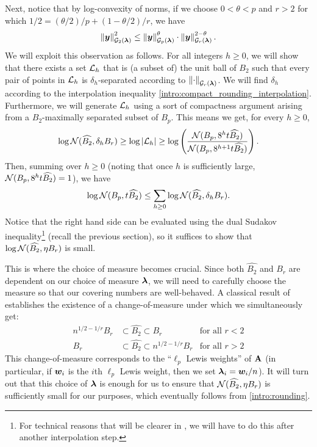 \documentclass[11pt]{article}
\numberwithin{equation}{section}
\begin{document}
Next, notice that by log-convexity of norms, if we choose $0 < \theta < p$ and $r > 2$ for which $1/2 = (\theta/2)/p + (1-\theta/2)/r$, we have
\begin{align}
    \left\lVert \bm{y} \right\rVert_{\mathcal{G}_{2}(\bm{\lambda})}^2 \le \left\lVert \bm{y} \right\rVert_{\mathcal{G}_{p}(\bm{\lambda})}^{\theta} \cdot \left\lVert \bm{y} \right\rVert_{\mathcal{G}_{r}(\bm{\lambda})}^{2-\theta}.\label{intro:compact_rounding_interpolation}
\end{align}
We will exploit this observation as follows. For all integers $h \ge 0$, we will show that there exists a set $\mathcal{L}_h$ that is (a subset of) the unit ball of $B_2$ such that every pair of points in $\mathcal{L}_h$ is $\delta_h$-separated according to $\left\lVert \cdot \right\rVert_{\mathcal{G}_{r}(\bm{\lambda})}$. We will find $\delta_h$ according to the interpolation inequality \eqref{intro:compact_rounding_interpolation}. Furthermore, we will generate $\mathcal{L}_h$ using a sort of compactness argument arising from a $B_2$-maximally separated subset of $B_p$. This means we get, for every $h \ge 0$,
\begin{align*}
    \log\mathcal{N}(\widehat{B_2}, \delta_h B_r) \ge \log\left\lvert \mathcal{L}_h \right\rvert \ge \log\left(\frac{\mathcal{N}(B_p,8^h t \widehat{B_2})}{\mathcal{N}(B_p, 8^{h+1} t \widehat{B_2})}\right).
\end{align*}
Then, summing over $h \ge 0$ (noting that once $h$ is sufficiently large, $\mathcal{N}(B_p, 8^ht \widehat{B_2}) = 1$), we have
\begin{align*}
    \log\mathcal{N}(B_p, t\widehat{B_2}) \le \sum_{h \ge 0} \log\mathcal{N}(\widehat{B_2},\delta_h B_r).
\end{align*}
Notice that the right hand side can be evaluated using the dual Sudakov inequality\footnote{For technical reasons that will be clearer in , we will have to do this after another interpolation step.} (recall the previous section), so it suffices to show that $\log\mathcal{N}(\widehat{B_2},\eta B_r)$ is small.

This is where the choice of measure becomes crucial. Since both $\widehat{B_2}$ and $B_r$ are dependent on our choice of measure $\bm{\lambda}$, we will need to carefully choose the measure so that our covering numbers are well-behaved. A classical result of \citet{Lewis1978} establishes the existence of a change-of-measure under which we simultaneously get:
\begin{equation}\label{intro:rounding}
  \begin{aligned}
    n^{1/2-1/r}B_r &\subset \widehat{B_2} \subset B_r & \text{for all } r < 2 \\
    B_r &\subset \widehat{B_2} \subset n^{1/2-1/r}B_r & \text{for all } r > 2
  \end{aligned}
\end{equation}
This change-of-measure corresponds to the ``$\ell_p$ Lewis weights'' of $\mathbf{A}$ (in particular, if $\bm{w}_i$ is the $i$th $\ell_p$ Lewis weight, then we set $\bm{\lambda}_i = \bm{w}_i/n$). It will turn out that this choice of $\bm{\lambda}$ is enough for us to ensure that $\mathcal{N}(\widehat{B_2}, \eta B_r)$ is sufficiently small for our purposes, which eventually follows from \eqref{intro:rounding}.
\end{document}
